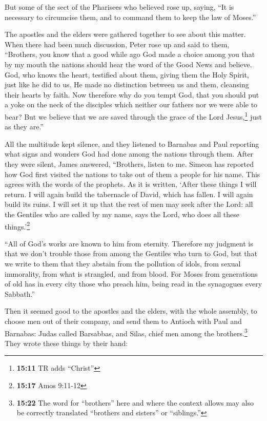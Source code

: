 But some of the sect of the Pharisees who believed rose
up, saying, ``It is necessary to circumcise them, and to command them to
keep the law of Moses.''

 The apostles and the elders were gathered together to see
about this matter.  When there had been much discussion,
Peter rose up and said to them, ``Brothers, you know that a good while
ago God made a choice among you that by my mouth the nations should hear
the word of the Good News and believe.  God, who knows the
heart, testified about them, giving them the Holy Spirit, just like he
did to us.  He made no distinction between us and them,
cleansing their hearts by faith.  Now therefore why do
you tempt God, that you should put a yoke on the neck of the disciples
which neither our fathers nor we were able to bear?  But
we believe that we are saved through the grace of the Lord
Jesus,\footnote{\textbf{15:11} TR adds ``Christ''} just as they are.''

 All the multitude kept silence, and they listened to
Barnabas and Paul reporting what signs and wonders God had done among
the nations through them.  After they were silent, James
answered, ``Brothers, listen to me.  Simeon has reported
how God first visited the nations to take out of them a people for his
name.  This agrees with the words of the prophets. As it
is written,  `After these things I will return. I will
again build the tabernacle of David, which has fallen. I will again
build its ruins. I will set it up  that the rest of men
may seek after the Lord: all the Gentiles who are called by my name,
says the Lord, who does all these things.'\footnote{\textbf{15:17} Amos
  9:11-12}

 ``All of God's works are known to him from eternity.
 Therefore my judgment is that we don't trouble those
from among the Gentiles who turn to God,  but that we
write to them that they abstain from the pollution of idols, from sexual
immorality, from what is strangled, and from blood.  For
Moses from generations of old has in every city those who preach him,
being read in the synagogues every Sabbath.''

 Then it seemed good to the apostles and the elders, with
the whole assembly, to choose men out of their company, and send them to
Antioch with Paul and Barnabas: Judas called Barsabbas, and Silas, chief
men among the brothers.\footnote{\textbf{15:22} The word for
  ``brothers'' here and where the context allows may also be correctly
  translated ``brothers and sisters'' or ``siblings.''} 
They wrote these things by their hand:

